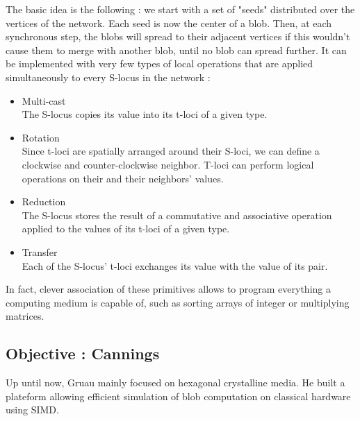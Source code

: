 \documentclass{article}
\begin{document}
The basic idea is the following : we start with a set of "seeds" distributed over the vertices of the network. Each seed is now the center of a blob. Then, at each synchronous step, the blobs will spread to their adjacent vertices if this wouldn't cause them to merge with another blob, until no blob can spread further. It can be implemented with very few types of local operations that are applied simultaneously to every S-locus in the network :
\begin{itemize}
	\item Multi-cast\\
	The S-locus copies its value into its t-loci of a given type.
	\item Rotation\\
	Since t-loci are spatially arranged around their S-loci, we can define a clockwise and counter-clockwise neighbor. T-loci can perform logical operations on their and their neighbors' values.
	\item Reduction\\
	The S-locus stores the result of a commutative and associative operation applied to the values of its t-loci of a given type.
	\item Transfer\\
	Each of the S-locus' t-loci exchanges its value with the value of its pair. 
\end{itemize}
In fact, clever association of these primitives allows to program everything a computing medium is capable of, such as sorting arrays of integer or multiplying matrices\supercite{blob_computing2}.

\subsection{Objective : Cannings}

Up until now, Gruau mainly focused on hexagonal crystalline media. He built a plateform allowing efficient simulation of blob computation on classical hardware using SIMD\supercite{Voronoi, platform_CA2}. 
\end{document}
